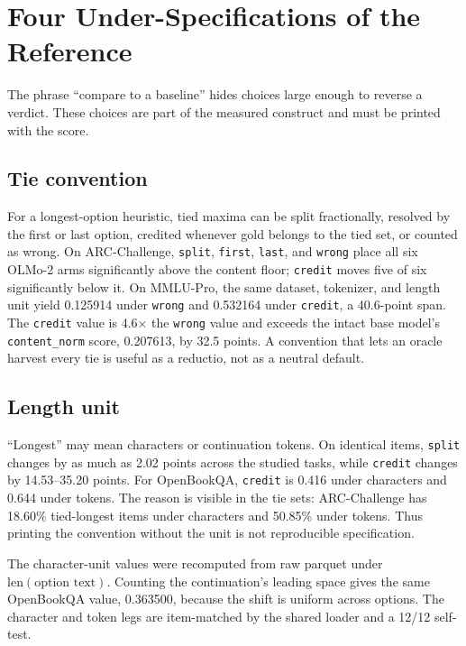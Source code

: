 \section{Four Under-Specifications of the Reference}
\label{sec:nulls}

The phrase ``compare to a baseline'' hides choices large enough to reverse a verdict. These choices are part of the measured construct and must be printed with the score.

\subsection{Tie convention}

For a longest-option heuristic, tied maxima can be split fractionally, resolved by the first or last option, credited whenever gold belongs to the tied set, or counted as wrong. On ARC-Challenge, \texttt{split}, \texttt{first}, \texttt{last}, and \texttt{wrong} place all six OLMo-2 arms significantly above the content floor; \texttt{credit} moves five of six significantly below it. On MMLU-Pro, the same dataset, tokenizer, and length unit yield 0.125914 under \texttt{wrong} and 0.532164 under \texttt{credit}, a 40.6-point span. The \texttt{credit} value is 4.6$\times$ the \texttt{wrong} value and exceeds the intact base model's \texttt{content\_norm} score, 0.207613, by 32.5 points. A convention that lets an oracle harvest every tie is useful as a reductio, not as a neutral default.

\subsection{Length unit}

``Longest'' may mean characters or continuation tokens. On identical items, \texttt{split} changes by as much as 2.02 points across the studied tasks, while \texttt{credit} changes by 14.53--35.20 points. For OpenBookQA, \texttt{credit} is 0.416 under characters and 0.644 under tokens. The reason is visible in the tie sets: ARC-Challenge has 18.60\% tied-longest items under characters and 50.85\% under tokens. Thus printing the convention without the unit is not reproducible specification.

The character-unit values were recomputed from raw parquet under $\mathrm{len}(\text{option text})$. Counting the continuation's leading space gives the same OpenBookQA value, 0.363500, because the shift is uniform across options. The character and token legs are item-matched by the shared loader and a 12/12 self-test.

